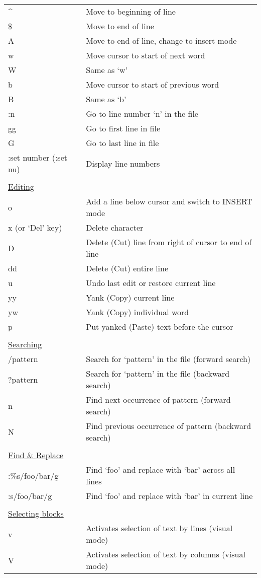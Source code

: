 \documentclass[11pt,a4paper,oneside]{article}
\begin{document}
\begin{table}
\begin{tabular}{p{4.5cm} l}
\^{} & Move to beginning of line \\
\$ & Move to end of line \\
A & Move to end of line, change to insert mode \\
w & Move cursor to start of next word \\
W & Same as `w' \\
b & Move cursor to start of previous word \\
B & Same as `b' \\
:n & Go to line number `n' in the file \\
gg & Go to first line in file \\
G & Go to last line in file \\
:set number (:set nu) & Display line numbers \\
 & \\[-1.5ex]
\multicolumn{2}{l}{\underline{Editing}} \\
o & Add a line below cursor and switch to INSERT mode \\
x (or `Del' key) & Delete character \\
D & Delete (Cut) line from right of cursor to end of line \\
dd & Delete (Cut) entire line \\
u & Undo last edit or restore current line \\
yy & Yank (Copy) current line \\
yw & Yank (Copy) individual word \\
p & Put yanked (Paste) text before the cursor \\
 & \\[-1.5ex]
\multicolumn{2}{l}{\underline{Searching}} \\
/pattern & Search for `pattern' in the file (forward search) \\
?pattern & Search for `pattern' in the file (backward search) \\
n & Find next occurrence of pattern (forward search) \\
N & Find previous occurrence of pattern (backward search) \\
 & \\[-1.5ex]
\multicolumn{2}{l}{\underline{Find \& Replace}} \\
:\%s/foo/bar/g & Find `foo' and replace with `bar' across all lines \\
:s/foo/bar/g & Find `foo' and replace with `bar' in current line \\
 & \\[-1.5ex]
\multicolumn{2}{l}{\underline{Selecting blocks}} \\
v & Activates selection of text by lines (visual mode) \\
V & Activates selection of text by columns (visual mode) \\

\end{tabular}

\end{table}
\end{document}
